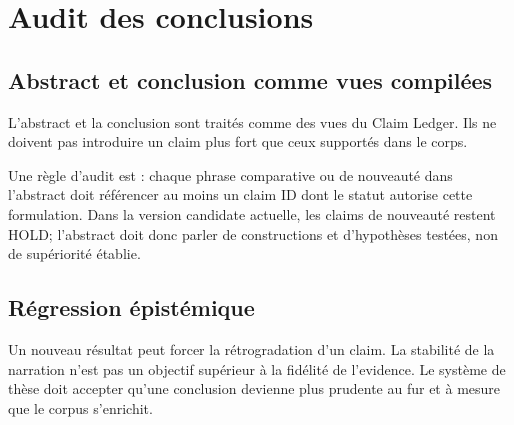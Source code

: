 \chapter{Audit des conclusions}

\section{Abstract et conclusion comme vues compilées}

L'abstract et la conclusion sont traités comme des vues du Claim Ledger. Ils ne doivent pas introduire un claim plus fort que ceux supportés dans le corps.

Une règle d'audit est : chaque phrase comparative ou de nouveauté dans l'abstract doit référencer au moins un claim ID dont le statut autorise cette formulation. Dans la version candidate actuelle, les claims de nouveauté restent HOLD; l'abstract doit donc parler de constructions et d'hypothèses testées, non de supériorité établie.

\section{Régression épistémique}

Un nouveau résultat peut forcer la rétrogradation d'un claim. La stabilité de la narration n'est pas un objectif supérieur à la fidélité de l'evidence. Le système de thèse doit accepter qu'une conclusion devienne plus prudente au fur et à mesure que le corpus s'enrichit.